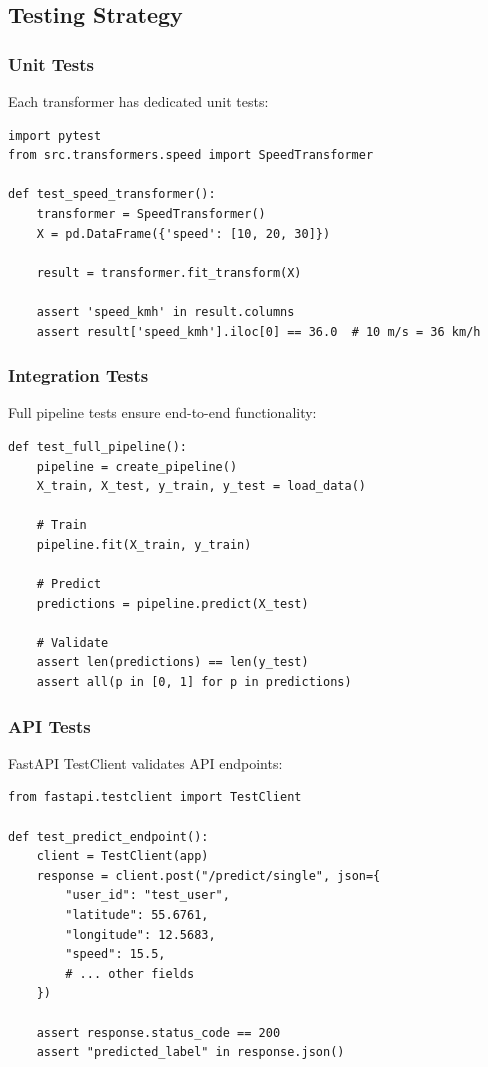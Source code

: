 \subsection{Testing Strategy}

\subsubsection{Unit Tests}

Each transformer has dedicated unit tests:

\begin{lstlisting}[style=python, caption=Unit Test Example]
import pytest
from src.transformers.speed import SpeedTransformer

def test_speed_transformer():
    transformer = SpeedTransformer()
    X = pd.DataFrame({'speed': [10, 20, 30]})
    
    result = transformer.fit_transform(X)
    
    assert 'speed_kmh' in result.columns
    assert result['speed_kmh'].iloc[0] == 36.0  # 10 m/s = 36 km/h
\end{lstlisting}

\subsubsection{Integration Tests}

Full pipeline tests ensure end-to-end functionality:

\begin{lstlisting}[style=python, caption=Integration Test]
def test_full_pipeline():
    pipeline = create_pipeline()
    X_train, X_test, y_train, y_test = load_data()
    
    # Train
    pipeline.fit(X_train, y_train)
    
    # Predict
    predictions = pipeline.predict(X_test)
    
    # Validate
    assert len(predictions) == len(y_test)
    assert all(p in [0, 1] for p in predictions)
\end{lstlisting}

\subsubsection{API Tests}

FastAPI TestClient validates API endpoints:

\begin{lstlisting}[style=python, caption=API Test]
from fastapi.testclient import TestClient

def test_predict_endpoint():
    client = TestClient(app)
    response = client.post("/predict/single", json={
        "user_id": "test_user",
        "latitude": 55.6761,
        "longitude": 12.5683,
        "speed": 15.5,
        # ... other fields
    })
    
    assert response.status_code == 200
    assert "predicted_label" in response.json()
\end{lstlisting}

